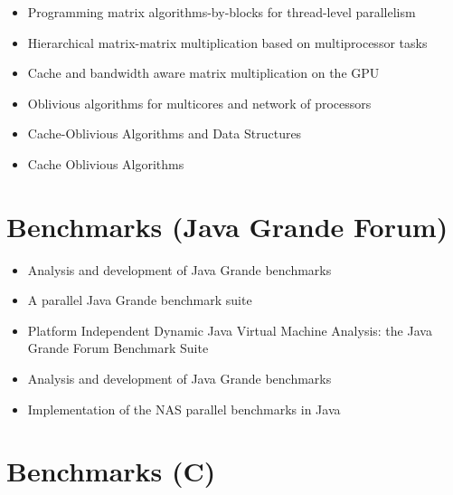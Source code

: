 \begin{itemize}
\item Programming matrix algorithms-by-blocks for thread-level
  parallelism \cite{Quintana-Orti2009}
\item Hierarchical matrix-matrix multiplication based on
  multiprocessor tasks \cite{Hunold2004}
\item Cache and bandwidth aware matrix multiplication on the GPU
  \cite{Hall2001}
\item Oblivious algorithms for multicores and network of processors
  \cite{Chowdhury2009}
\item Cache-Oblivious Algorithms and Data Structures
  \cite{Demaine2002}
\item Cache Oblivious Algorithms \cite{Kumar2003}
\end{itemize}


\section{Benchmarks (Java Grande Forum)}
\label{sec:lr-benchmarks-java}

\begin{itemize}
\item Analysis and development of Java Grande benchmarks
  \cite{Mathew1999}
\item A parallel Java Grande benchmark suite \cite{Smith2001}
\item Platform Independent Dynamic Java Virtual Machine Analysis: the
  Java Grande Forum Benchmark Suite \cite{Gregg2003}
\item Analysis and development of Java Grande benchmarks
  \cite{Mathew1999a}
\item Implementation of the NAS parallel benchmarks in Java
  \cite{Frumkin2000}
\end{itemize}


\section{Benchmarks (C)}
\label{sec:lr-benchmarks-c}


